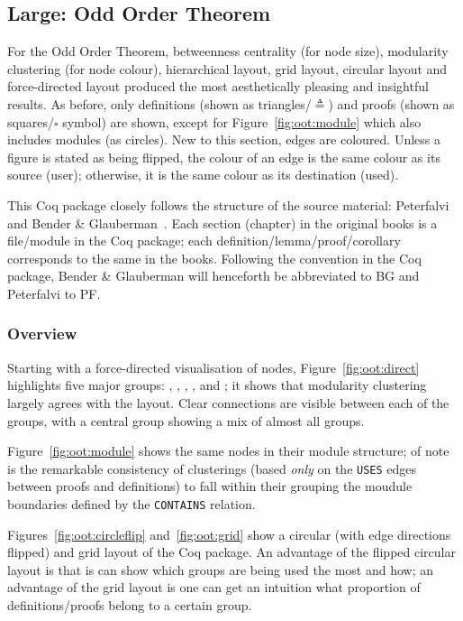 \subsection{Large: Odd Order Theorem}

For the Odd Order Theorem, betweenness centrality (for node size), modularity
clustering (for node colour), hierarchical layout, grid layout, circular layout
and force-directed layout produced the most aesthetically pleasing and
insightful results. As before, only definitions (shown as
triangles/$\triangleq$) and proofs (shown as squares/$\square$ symbol) are
shown, except for Figure~\ref{fig:oot:module} which also includes modules (as
circles). New to this section, edges are coloured. Unless a figure is stated as
being flipped, the colour of an edge is the same colour as its source (user);
otherwise, it is the same colour as its destination (used).

This Coq package closely follows the structure of the source material:
Peterfalvi~\cite{peterfalvi2000oot} and Bender \&
Glauberman~\cite{bender1994oot}. Each section (chapter) in the original books is
a file/module in the Coq package; each definition/lemma/proof/corollary
corresponds to the same in the books. Following the convention in the Coq
package, Bender \& Glauberman will henceforth be abbreviated to BG and
Peterfalvi to PF.

\subsubsection{Overview}

Starting with a force-directed visualisation of nodes,
Figure~\ref{fig:oot:direct} highlights five major groups: ,
, , ,  and
; it shows that modularity clustering largely agrees with the
layout. Clear connections are visible between each of the groups, with a central
group showing a mix of almost all groups.

Figure~\ref{fig:oot:module} shows the same nodes in their module structure; of
note is the remarkable consistency of clusterings (based \emph{only} on the
\texttt{USES} edges between proofs and definitions) to fall within their
grouping the moudule boundaries defined by the \texttt{CONTAINS} relation.

Figures~\ref{fig:oot:circleflip} and~\ref{fig:oot:grid} show a circular (with
edge directions flipped) and grid layout of the Coq package. An advantage of the
flipped circular layout is that is can show which groups are being used the most
and how; an advantage of the grid layout is one can get an intuition what
proportion of definitions/proofs belong to a certain group.

